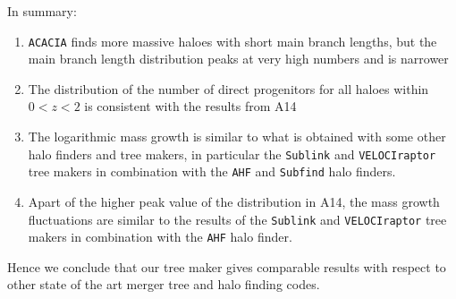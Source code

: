 In summary:

\begin{enumerate}
	\item \texttt{ACACIA} finds more massive haloes with short main branch lengths, but the main branch length distribution peaks at very high numbers and is narrower
	\item The distribution of the number of direct progenitors for all haloes within $0 < z < 2$ is consistent with the results from A14
	\item The logarithmic mass growth is similar to what is obtained with some other halo finders and tree makers, in particular the \texttt{Sublink} and \texttt{VELOCIraptor} tree makers in combination with the \texttt{AHF} and \texttt{Subfind} halo finders. 
	\item Apart of the higher peak value of the distribution in A14, the mass growth fluctuations are similar to the results of the \texttt{Sublink} and \texttt{VELOCIraptor} tree makers in combination with the \texttt{AHF} halo finder.
\end{enumerate}

Hence we conclude that our tree maker gives comparable results with respect to other state of the art merger tree and halo finding codes.
